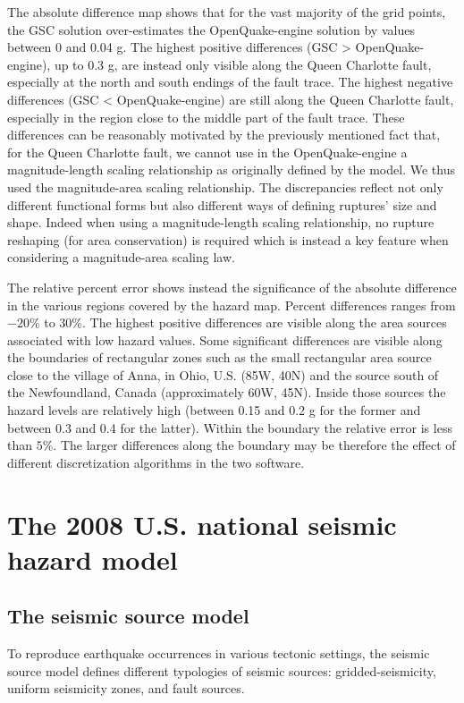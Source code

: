 The absolute difference map shows that for the vast majority of the grid points,
the GSC solution over-estimates the OpenQuake-engine solution by values between
0 and 0.04 g. The highest positive differences (GSC > OpenQuake-engine), up to
0.3 g, are instead only visible along the Queen Charlotte fault, especially at
the north and south endings of the fault trace. The highest negative differences
(GSC < OpenQuake-engine) are still along the Queen Charlotte fault, especially
in the region close to the middle part of the fault trace. These differences can
be reasonably motivated by the previously mentioned fact that, for the Queen
Charlotte fault, we cannot use in the OpenQuake-engine a magnitude-length
scaling relationship as originally defined by the model. We thus used the
\citet{wells1994} magnitude-area scaling relationship. The discrepancies reflect
not only different functional forms but also different ways of defining
ruptures' size and shape. Indeed when using a magnitude-length scaling
relationship, no rupture reshaping (for area conservation) is required which is
instead a key feature when considering a magnitude-area scaling law.

The relative percent error shows instead the significance of the absolute
difference in the various regions covered by the hazard map. Percent differences
ranges from $-20\%$ to $30\%$. The highest positive differences are visible
along the area sources associated with low hazard values. Some significant
differences are visible along the boundaries of rectangular zones such as the
small rectangular area source close to the village of Anna, in Ohio, U.S. (85W,
40N) and the source south of the Newfoundland, Canada (approximately 60W, 45N).
Inside those sources the hazard levels are relatively high (between 0.15 and 0.2
g for the former and between 0.3 and 0.4 for the latter). Within the boundary
the relative error is less than $5\%$. The larger differences along the boundary
may be therefore the effect of different discretization algorithms in the two
software.
%
\section{The 2008 U.S. national seismic hazard model}
%
\subsection{The seismic source model}
To reproduce earthquake occurrences in various tectonic settings, the seismic
source model defines different typologies of seismic sources:
gridded-seismicity, uniform seismicity zones, and fault sources.

